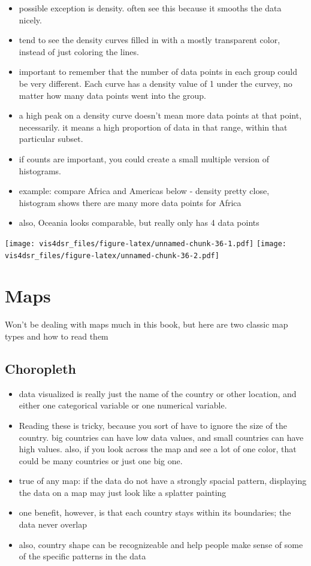 \documentclass[
]{krantz}
\providecommand{\tightlist}{%
  \setlength{\itemsep}{0pt}\setlength{\parskip}{0pt}}
\begin{document}
\begin{itemize}
\tightlist
\item
  possible exception is density. often see this because it smooths the data nicely.
\item
  tend to see the density curves filled in with a mostly transparent color, instead
  of just coloring the lines.
\item
  important to remember that the number of data points in each group could be very
  different. Each curve has a density value of 1 under the curvey, no matter how many
  data points went into the group.
\item
  a high peak on a density curve doesn't mean more data points at that point, necessarily.
  it means a high proportion of data in that range, within that particular subset.
\item
  if counts are important, you could create a small multiple version of histograms.
\item
  example: compare Africa and Americas below - density pretty close, histogram shows
  there are many more data points for Africa
\item
  also, Oceania looks comparable, but really only has 4 data points
\end{itemize}

\texttt{[image: vis4dsr\_files/figure-latex/unnamed-chunk-36-1.pdf]} \texttt{[image: vis4dsr\_files/figure-latex/unnamed-chunk-36-2.pdf]}

\hypertarget{maps}{%
\section{Maps}\label{maps}}

Won't be dealing with maps much in this book, but here are two classic map
types and how to read them

\hypertarget{choropleth}{%
\subsection{Choropleth}\label{choropleth}}

\begin{itemize}
\tightlist
\item
  data visualized is really just the name of the country or other location, and
  either one categorical variable or one numerical variable.
\item
  Reading these is tricky, because you sort of have to ignore the size of the
  country. big countries can have low data values, and small countries can have high
  values. also, if you look across the map and see a lot of one color, that could be
  many countries or just one big one.
\item
  true of any map: if the data do not have a strongly spacial pattern, displaying
  the data on a map may just look like a splatter painting
\item
  one benefit, however, is that each country stays within its boundaries; the
  data never overlap
\item
  also, country shape can be recognizeable and help people make sense of some of
  the specific patterns in the data
\end{itemize}
\end{document}
